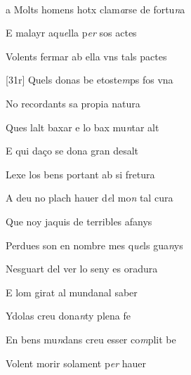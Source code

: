 \documentclass[12pt]{article}
\renewcommand{\espaiAbansEtiquetaPoema}{\vspace{0ex}}
\begin{document}
\begin{estrofa}

\espaiAbansEtiquetaPoema

\\

\end{estrofa}


\begin{estrofa}

 a Molts homens hotx clam\textit{a}rse de fortu\textit{n}a

 E malayr aq\textit{ue}lla p\textit{er} sos actes

 Volents fermar ab ella vns tals pactes

 [31r] Quels donas be etoste\textit{m}ps fos vna

 No recordants sa propia natura

 Ques lalt baxar e lo bax mu\textit{n}tar alt

 E qui da\c{c}o se dona gran desalt

 Lexe los bens portant ab si fretura

\end{estrofa}



\begin{estrofa}

 A deu no plach hauer d\textit{e}l mo\textit{n} tal cura

 Que noy jaquis de terribles afanys

 Perdues son en nombre mes q\textit{ue}ls gua\textit{n}ys

 Nesguart del ver lo seny es oradura

 E lom girat al mundanal saber

 Ydolas creu dona\textit{n}ty plena fe

 En bens mu\textit{n}dans creu esser co\textit{m}plit be

 Volent morir solament p\textit{er} hauer

\end{estrofa}
\end{document}
